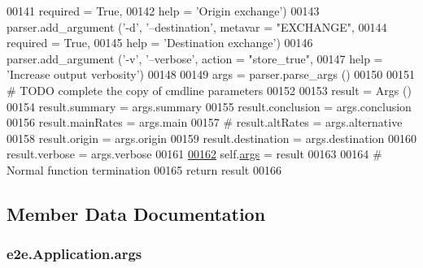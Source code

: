 \begin{DoxyCode}
00141                              required = \textcolor{keyword}{True},
00142                              help = \textcolor{stringliteral}{'Origin exchange'})
00143         parser.add\_argument (\textcolor{stringliteral}{'-d'}, \textcolor{stringliteral}{'--destination'}, metavar = \textcolor{stringliteral}{"EXCHANGE"},
00144                              required = \textcolor{keyword}{True},
00145                              help = \textcolor{stringliteral}{'Destination exchange'})
00146         parser.add\_argument (\textcolor{stringliteral}{'-v'}, \textcolor{stringliteral}{'--verbose'}, action = \textcolor{stringliteral}{"store\_true"},
00147                              help = \textcolor{stringliteral}{'Increase output verbosity'})
00148                              
00149         args = parser.parse\_args ()
00150         
00151         \textcolor{comment}{# TODO complete the copy of cmdline parameters}
00152         
00153         result = Args ()
00154         result.summary     = args.summary 
00155         result.conclusion  = args.conclusion 
00156         result.mainRates   = args.main 
00157 \textcolor{comment}{#        result.altRates    = args.alternative }
00158         result.origin      = args.origin 
00159         result.destination = args.destination 
00160         result.verbose     = args.verbose
00161         
\hypertarget{classe2e_1_1_application.tex_l00162}{}\hyperlink{classe2e_1_1_application_abade6fc2e2c04ddd7e48137a2a7721bd}{00162}         self.\hyperlink{classe2e_1_1_application_abade6fc2e2c04ddd7e48137a2a7721bd}{args} = result
00163         
00164         \textcolor{comment}{# Normal function termination}
00165         \textcolor{keywordflow}{return} result
00166         
\end{DoxyCode}


\subsection{Member Data Documentation}
\subsubsection[{\texorpdfstring{args}{args}}]{\setlength{\rightskip}{0pt plus 5cm}e2e.\+Application.\+args}\hypertarget{classe2e_1_1_application_abade6fc2e2c04ddd7e48137a2a7721bd}{}\label{classe2e_1_1_application_abade6fc2e2c04ddd7e48137a2a7721bd}


